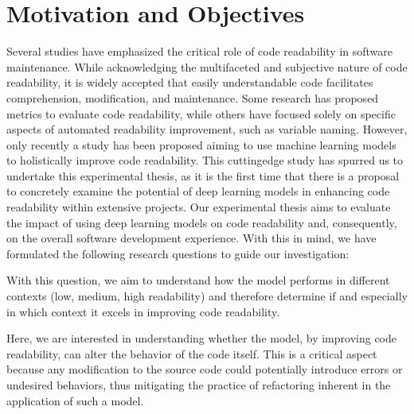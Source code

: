\section{Motivation and Objectives}
Several studies have emphasized the critical role of code readability in software maintenance. While acknowledging the multifaceted and subjective nature of code readability, it is widely accepted that easily understandable code facilitates comprehension, modification, and maintenance. Some research has proposed metrics to evaluate code readability, while others have focused solely on specific aspects of automated readability improvement, such as variable naming. However, only recently a study has been proposed aiming to use machine learning models to holistically improve code readability. This cutting\-edge study has spurred us to undertake this experimental thesis, as it is the first time that there is a proposal to concretely examine the potential of deep learning models in enhancing code readability within extensive projects. Our experimental thesis aims to evaluate the impact of using deep learning models on code readability and, consequently, on the overall software development experience.
With this in mind, we have formulated the following research questions to guide our investigation:


\begin{flushleft}
\end{flushleft}
With this question, we aim to understand how the model performs in different contexts (low, medium, high readability) and therefore determine if and especially in which context it excels in improving code readability.

\begin{flushleft}
\end{flushleft}
Here, we are interested in understanding whether the model, by improving code readability, can alter the behavior of the code itself. This is a critical aspect because any modification to the source code could potentially introduce errors or undesired behaviors, thus mitigating the practice of refactoring inherent in the application of such a model.


